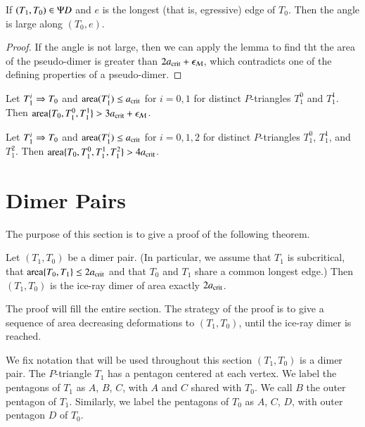 \begin{corollary}
  If $(T_1,T_0)\in \Psi D$ and $e$ is the longest (that is, egressive)
  edge of $T_0$.  Then the angle is large along $(T_0,e)$.
\end{corollary}

\begin{proof} 
  If the angle is not large, then we can apply the lemma to find tht
  the area of the pseudo-dimer is greater than $2a_\text{crit} + \epsilon_{\mathcal M}$,
  which contradicts one of the defining properties of a pseudo-dimer.
\end{proof}

\begin{lemma}
  Let $T_1^i\Rightarrow T_0$ and ${\operatorname{area}}(T_1^i)\le a_\text{crit}$ for $i=0,1$ for
  distinct $P$-triangles $T_1^0$ and $T_1^1$.  Then
  ${\operatorname{area}}\{T_0,T_1^0,T_1^1\} > 3a_\text{crit} + \epsilon_{\mathcal M}$.
\end{lemma}

\begin{lemma}
  Let $T_1^i\Rightarrow T_0$ and ${\operatorname{area}}(T_1^i)\le a_\text{crit}$ for $i=0,1,2$ for
  distinct $P$-triangles $T_1^0$, $T_1^1$, and $T_1^2$.  Then
  ${\operatorname{area}}\{T_0,T_1^0,T_1^1,T_1^2\} > 4a_\text{crit}$.
\end{lemma}


\section{Dimer Pairs}

The purpose of this section is to give a proof of the following
theorem.


\begin{theorem}
  Let $(T_1,T_0)$ be a dimer pair.  (In particular, we assume that
  $T_1$ is subcritical, that ${\operatorname{area}}\{T_0,T_1\}\le 2a_\text{crit}$ and that
  $T_0$ and $T_1$ share a common longest edge.)  Then $(T_1,T_0)$ is
  the ice-ray dimer of area exactly $2a_\text{crit}$.
\end{theorem}

The proof will fill the entire section.  The strategy of the proof is
to give a sequence of area decreasing deformations to $(T_1,T_0)$,
until the ice-ray dimer is reached.

We fix notation that will be used throughout this section $(T_1,T_0)$
is a dimer pair.  The $P$-triangle $T_1$ has a pentagon centered at
each vertex.  We label the pentagons of $T_1$ as $A$, $B$, $C$, with
$A$ and $C$ shared with $T_0$.  We call $B$ the outer pentagon of
$T_1$.  Similarly, we label the pentagons of $T_0$ as $A$, $C$, $D$,
with outer pentagon $D$ of $T_0$.


